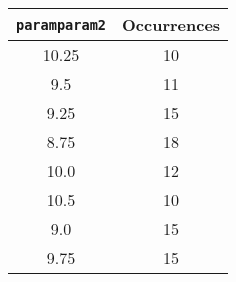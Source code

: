 \documentclass[letterpaper, 12pt]{article}
\begin{document}
\begin{longtable}{|c|c|}
\hline
\textbf{\texttt{paramparam2}} & \textbf{Occurrences} \\
\hline
10.25 & 10 \\
\hline
9.5 & 11 \\
\hline
9.25 & 15 \\
\hline
8.75 & 18 \\
\hline
10.0 & 12 \\
\hline
10.5 & 10 \\
\hline
9.0 & 15 \\
\hline
9.75 & 15 \\
\hline
\end{longtable}
\end{document}
